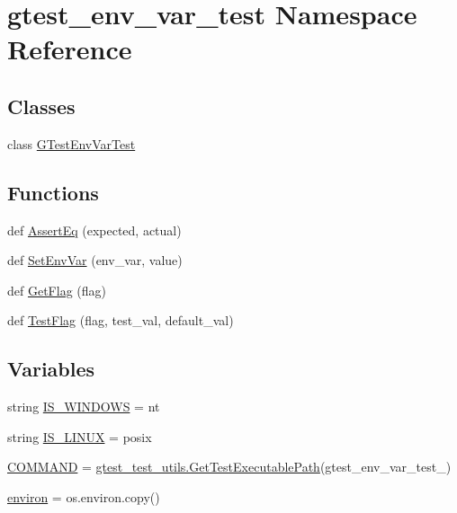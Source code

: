 \hypertarget{namespacegtest__env__var__test}{}\section{gtest\+\_\+env\+\_\+var\+\_\+test Namespace Reference}
\label{namespacegtest__env__var__test}
\subsection*{Classes}
\begin{DoxyCompactItemize}
\item 
class \hyperlink{classgtest__env__var__test_1_1GTestEnvVarTest}{G\+Test\+Env\+Var\+Test}
\end{DoxyCompactItemize}
\subsection*{Functions}
\begin{DoxyCompactItemize}
\item 
def \hyperlink{namespacegtest__env__var__test_a8c94a5abd1117cdd2b402c0059a49a3a}{Assert\+Eq} (expected, actual)
\item 
def \hyperlink{namespacegtest__env__var__test_a634ee0fa1ccf4713411992e7373e49e9}{Set\+Env\+Var} (env\+\_\+var, value)
\item 
def \hyperlink{namespacegtest__env__var__test_a79d5f78f47c7dde37a0941d8604cf857}{Get\+Flag} (flag)
\item 
def \hyperlink{namespacegtest__env__var__test_aa7bb6bbb50ba35349bbdae6d881faee8}{Test\+Flag} (flag, test\+\_\+val, default\+\_\+val)
\end{DoxyCompactItemize}
\subsection*{Variables}
\begin{DoxyCompactItemize}
\item 
string \hyperlink{namespacegtest__env__var__test_af792d1403a09d46bffcd3466821cd0fb}{I\+S\+\_\+\+W\+I\+N\+D\+O\+WS} = \textquotesingle{}nt\textquotesingle{}
\item 
string \hyperlink{namespacegtest__env__var__test_a33b1e2e9afe9d59d75503de4a1297486}{I\+S\+\_\+\+L\+I\+N\+UX} = \textquotesingle{}posix\textquotesingle{}
\item 
\hyperlink{namespacegtest__env__var__test_a36e02e39934750d022966df31c568a53}{C\+O\+M\+M\+A\+ND} = \hyperlink{namespacegtest__test__utils_a89ed3717984a80ffbb7a9c92f71b86a2}{gtest\+\_\+test\+\_\+utils.\+Get\+Test\+Executable\+Path}(\textquotesingle{}gtest\+\_\+env\+\_\+var\+\_\+test\+\_\+\textquotesingle{})
\item 
\hyperlink{namespacegtest__env__var__test_ac671a59c1b805f7e9511e91380865cda}{environ} = os.\+environ.\+copy()
\end{DoxyCompactItemize}


